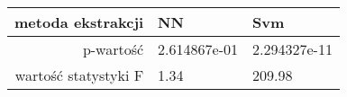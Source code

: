 \begin{tabular}{|r|l|l|}
  \hline
  metoda ekstrakcji & NN & Svm \\
  \hline
  p-wartość & 2.614867e-01 & 2.294327e-11 \\
  \hline
  wartość statystyki F & 1.34 & 209.98 \\
  \hline
\end{tabular}
